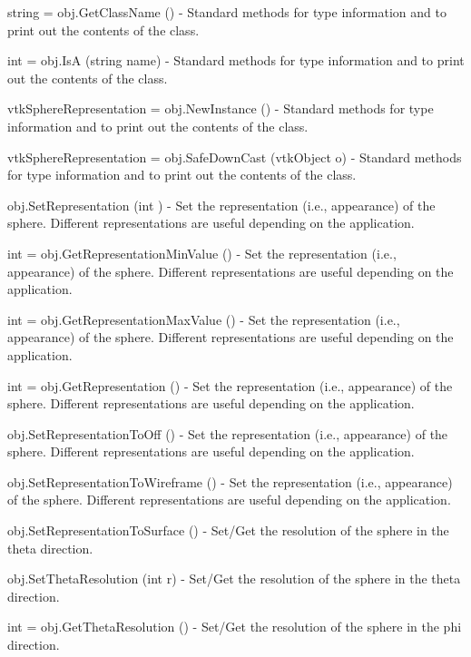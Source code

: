 \begin{DoxyItemize}
\item {\ttfamily string = obj.\-Get\-Class\-Name ()} -\/ Standard methods for type information and to print out the contents of the class.  
\item {\ttfamily int = obj.\-Is\-A (string name)} -\/ Standard methods for type information and to print out the contents of the class.  
\item {\ttfamily vtk\-Sphere\-Representation = obj.\-New\-Instance ()} -\/ Standard methods for type information and to print out the contents of the class.  
\item {\ttfamily vtk\-Sphere\-Representation = obj.\-Safe\-Down\-Cast (vtk\-Object o)} -\/ Standard methods for type information and to print out the contents of the class.  
\item {\ttfamily obj.\-Set\-Representation (int )} -\/ Set the representation (i.\-e., appearance) of the sphere. Different representations are useful depending on the application.  
\item {\ttfamily int = obj.\-Get\-Representation\-Min\-Value ()} -\/ Set the representation (i.\-e., appearance) of the sphere. Different representations are useful depending on the application.  
\item {\ttfamily int = obj.\-Get\-Representation\-Max\-Value ()} -\/ Set the representation (i.\-e., appearance) of the sphere. Different representations are useful depending on the application.  
\item {\ttfamily int = obj.\-Get\-Representation ()} -\/ Set the representation (i.\-e., appearance) of the sphere. Different representations are useful depending on the application.  
\item {\ttfamily obj.\-Set\-Representation\-To\-Off ()} -\/ Set the representation (i.\-e., appearance) of the sphere. Different representations are useful depending on the application.  
\item {\ttfamily obj.\-Set\-Representation\-To\-Wireframe ()} -\/ Set the representation (i.\-e., appearance) of the sphere. Different representations are useful depending on the application.  
\item {\ttfamily obj.\-Set\-Representation\-To\-Surface ()} -\/ Set/\-Get the resolution of the sphere in the theta direction.  
\item {\ttfamily obj.\-Set\-Theta\-Resolution (int r)} -\/ Set/\-Get the resolution of the sphere in the theta direction.  
\item {\ttfamily int = obj.\-Get\-Theta\-Resolution ()} -\/ Set/\-Get the resolution of the sphere in the phi direction.  

\end{DoxyItemize}
